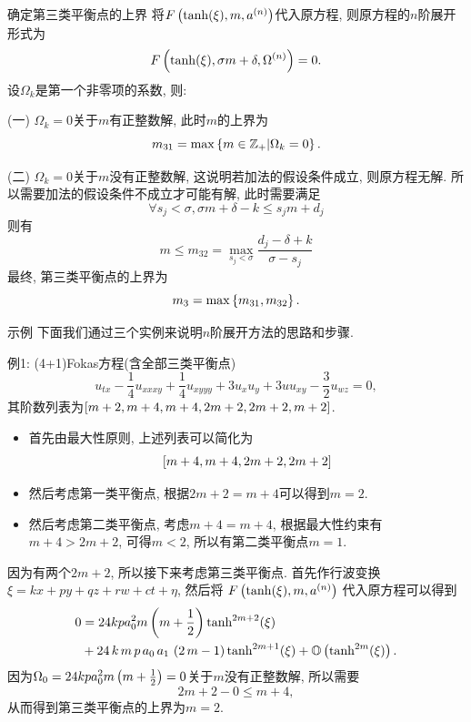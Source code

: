 \begin{frame}{确定第三类平衡点的上界}    
\small 
将$F\left(\tanh(\xi),m,a^{(n)}\right)$代入原方程, 则原方程的$n$阶展开形式为
\[
    F\left(\tanh(\xi),\sigma m+\delta,\Omega^{(n)}\right)=0 .
\]
设$\Omega_{k}$是第一个非零项的系数, 则: 

(一) $\Omega_{k}=0$关于$m$有正整数解, 此时$m$的上界为
\[
    m_{31}=\max\left\{m\in \mathbb Z_+|\Omega_{k}=0\right\}.
\]

(二) $\Omega_{k}=0$关于$m$没有正整数解, 这说明若加法的假设条件成立, 则原方程无解. 所以需要加法的假设条件不成立才可能有解, 此时需要满足 
\[
    \forall s_j<\sigma, \sigma m + \delta - k \le s_j m + d_j
\]
则有
\[
    m\le m_{32} = \underset{s_j<\sigma}{\max}{\frac{d_j-\delta+k}{\sigma-s_j}}
\]
最终, 第三类平衡点的上界为 
\[
    m_3 = \max\left\{m_{31},m_{32}\right\}. 
\]
\end{frame}

\begin{frame}{示例}
下面我们通过三个实例来说明$n$阶展开方法的思路和步骤. 

\end{frame}

\begin{frame}{例1: (4+1)Fokas方程(含全部三类平衡点)}
\begin{equation*}
    u_{tx}-\frac{1}{4}u_{xxxy}+\frac{1}{4}u_{xyyy}+3u_xu_y+3uu_{xy}-\frac{3}{2}u_{wz}=0 ,
\end{equation*}
其阶数列表为$\left[m+2,m+4,m+4,2m+2,2m+2,m+2\right]$. 
\begin{itemize}
\item 首先由最大性原则, 上述列表可以简化为\[\left[m+4,m+4,2m+2,2m+2\right]\]
\item 然后考虑第一类平衡点, 根据$2m+2=m+4$可以得到$m=2$.
\item 然后考虑第二类平衡点, 考虑$m+4=m+4$, 根据最大性约束有$m+4>2m+2$, 可得$m<2$, 所以有第二类平衡点$m=1$.
\end{itemize}
\end{frame}

\begin{frame}
因为有两个$2m+2$, 所以接下来考虑第三类平衡点. 首先作行波变换$\xi=kx+py+qz+rw+ct+\eta$, 然后将 $F\left(\tanh(\xi),m,a^{(n)}\right)$ 代入原方程可以得到 
\begin{equation*}
\begin{aligned}
0&=24kpa_0^2m\left(m+\frac{1}{2}\right)\tanh^{2m+2}(\xi)\\ 
&+24\,k\,m\,p\,{{a}_{0}}\,{{a}_{1}}\,\left( 2\,m-1\right)\tanh^{2m+1}(\xi)+\mathbb O\left(\tanh^{2m}(\xi)\right) . 
\end{aligned}
\end{equation*}
因为$\Omega_0=24kpa_0^2m\left(m+\frac{1}{2}\right)=0$关于$m$没有正整数解, 所以需要
\[2m+2-0\le m+4,\]
从而得到第三类平衡点的上界为$m=2$.

\end{frame}

